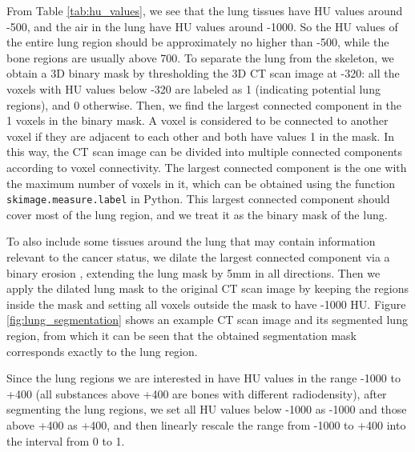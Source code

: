 \documentclass{article}
\begin{document}
From Table \ref{tab:hu_values}, we see that the lung tissues have HU values around -500, and the air in the lung have HU values around -1000. So the HU values of the entire lung region should be approximately no higher than -500, while the bone regions are usually above 700. To separate the lung from the skeleton, we obtain a 3D binary mask by thresholding the 3D CT scan image at -320: all the voxels with HU values below -320 are labeled as 1 (indicating potential lung regions), and 0 otherwise. Then, we find the largest connected component in the 1 voxels in the binary mask. A voxel is considered to be connected to another voxel if they are adjacent to each other and both have values 1 in the mask. In this way, the CT scan image can be divided into multiple connected components according to voxel connectivity. The largest connected component is the one with the maximum number of voxels in it, which can be obtained using the function \verb|skimage.measure.label| in Python. This largest connected component should cover most of the lung region, and we treat it as the binary mask of the lung.

To also include some tissues around the lung that may contain information relevant to the cancer status, we dilate the largest connected component via a binary erosion \cite{erosion_morphology}, extending the lung mask by 5mm in all directions. Then we apply the dilated lung mask to the original CT scan image by keeping the regions inside the mask and setting all voxels outside the mask to have -1000 HU. Figure \ref{fig:lung_segmentation} shows an example CT scan image and its segmented lung region, from which it can be seen that the obtained segmentation mask corresponds exactly to the lung region.

Since the lung regions we are interested in have HU values in the range -1000 to +400 (all substances above +400 are bones with different radiodensity), after segmenting the lung regions, we set all HU values below -1000 as -1000 and those above +400 as +400, and then linearly rescale the range from -1000 to +400 into the interval from 0 to 1.
\end{document}
